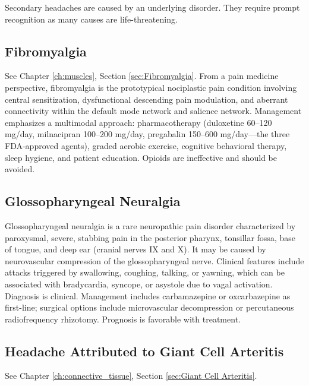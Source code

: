 Secondary headaches are caused by an underlying disorder. They require prompt recognition as many causes are life-threatening.

\subsection{Fibromyalgia}
\label{sec:Fibromyalgia Fibromyalgia}

See Chapter \ref{ch:muscles}, Section \ref{sec:Fibromyalgia}. From a pain medicine perspective, fibromyalgia is the prototypical nociplastic pain condition involving central sensitization, dysfunctional descending pain modulation, and aberrant connectivity within the default mode network and salience network. Management emphasizes a multimodal approach: pharmacotherapy (duloxetine 60--120 mg/day, milnacipran 100--200 mg/day, pregabalin 150--600 mg/day---the three FDA-approved agents), graded aerobic exercise, cognitive behavioral therapy, sleep hygiene, and patient education. Opioids are ineffective and should be avoided.

\subsection{Glossopharyngeal Neuralgia}
\label{sec:Glossopharyngeal Neuralgia}
Glossopharyngeal neuralgia is a rare neuropathic pain disorder characterized by paroxysmal, severe, stabbing pain in the posterior pharynx, tonsillar fossa, base of tongue, and deep ear (cranial nerves IX and X). It may be caused by neurovascular compression of the glossopharyngeal nerve. Clinical features include attacks triggered by swallowing, coughing, talking, or yawning, which can be associated with bradycardia, syncope, or asystole due to vagal activation. Diagnosis is clinical. Management includes carbamazepine or oxcarbazepine as first-line; surgical options include microvascular decompression or percutaneous radiofrequency rhizotomy. Prognosis is favorable with treatment.

\subsection{Headache Attributed to Giant Cell Arteritis}
\label{sec:Headache Giant Cell Arteritis}

See Chapter \ref{ch:connective_tissue}, Section \ref{sec:Giant Cell Arteritis}.

